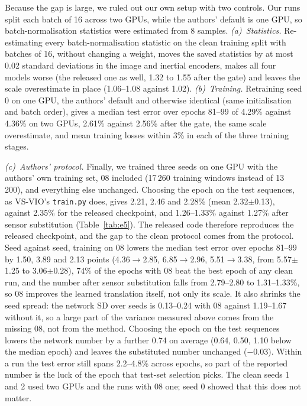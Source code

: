 \documentclass[letterpaper,journal]{IEEEtran}
\begin{document}
Because the gap is large, we ruled out our own setup with two controls. Our runs split each batch of 16 across two GPUs, while the authors' default is one GPU, so batch-normalisation statistics were estimated from 8 samples. \emph{(a)~Statistics.} Re-estimating every batch-normalisation statistic on the clean training split with batches of 16, without changing a weight, moves the saved statistics by at most 0.02 standard deviations in the image and inertial encoders, makes all four models worse (the released one as well, 1.32 to 1.55 after the gate) and leaves the scale overestimate in place (1.06--1.08 against 1.02). \emph{(b)~Training.} Retraining seed 0 on one GPU, the authors' default and otherwise identical (same initialisation and batch order), gives a median test error over epochs 81--99 of 4.29\% against 4.36\% on two GPUs, 2.61\% against 2.56\% after the gate, the same scale overestimate, and mean training losses within 3\% in each of the three training stages.

\emph{(c)~Authors' protocol.} Finally, we trained three seeds on one GPU with the authors' own training set, 08 included (17\,260 training windows instead of 13\,200), and everything else unchanged. Choosing the epoch on the test sequences, as VS-VIO's \texttt{train.py} does, gives 2.21, 2.46 and 2.28\% (mean 2.32$\pm$0.13), against 2.35\% for the released checkpoint, and 1.26--1.33\% against 1.27\% after sensor substitution (Table~\ref{tab:e5}). The released code therefore reproduces the released checkpoint, and the gap to the clean protocol comes from the protocol. Seed against seed, training on 08 lowers the median test error over epochs 81--99 by 1.50, 3.89 and 2.13 points (4.36$\to$2.85, 6.85$\to$2.96, 5.51$\to$3.38, from 5.57$\pm$1.25 to 3.06$\pm$0.28), 74\% of the epochs with 08 beat the best epoch of any clean run, and the number after sensor substitution falls from 2.79--2.80 to 1.31--1.33\%, so 08 improves the learned translation itself, not only its scale. It also shrinks the seed spread: the network SD over seeds is 0.13--0.24 with 08 against 1.19--1.67 without it, so a large part of the variance measured above comes from the missing 08, not from the method. Choosing the epoch on the test sequences lowers the network number by a further 0.74 on average (0.64, 0.50, 1.10 below the median epoch) and leaves the substituted number unchanged ($-0.03$). Within a run the test error still spans 2.2--4.8\% across epochs, so part of the reported number is the luck of the epoch that test-set selection picks. The clean seeds 1 and 2 used two GPUs and the runs with 08 one; seed 0 showed that this does not matter.
\end{document}
